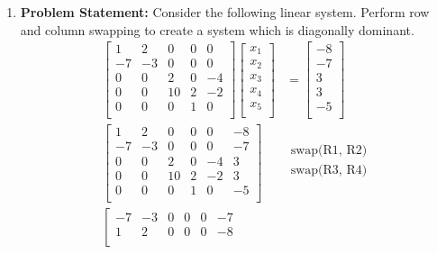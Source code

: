 \documentclass[12pt,twoside]{amsart}
\begin{document}
\begin{enumerate}
    \item \textbf{Problem Statement:} Consider the following linear system. Perform row and column swapping to create a system which is diagonally dominant.
    \begin{align*}
    \left[\begin{array}{ccccc}
        1 & 2 & 0 & 0 & 0 \\
        -7 & -3 & 0 & 0 & 0 \\
        0 & 0 & 2 & 0 & -4 \\
        0 & 0 & 10 & 2 & -2 \\
        0 & 0 & 0 & 1 & 0 \\
    \end{array}\right]\left[\begin{array}{c}
        x_1 \\
        x_2 \\
        x_3 \\
        x_4 \\
        x_5 \\
    \end{array}\right] & = \left[\begin{array}{c}
        -8 \\
        -7 \\
        3 \\
        3 \\
        -5 \\
    \end{array}\right] \\
    \left[\begin{array}{ccccc|c}
        1 & 2 & 0 & 0 & 0 & -8 \\
        -7 & -3 & 0 & 0 & 0 & -7 \\
        0 & 0 & 2 & 0 & -4 & 3 \\
        0 & 0 & 10 & 2 & -2 & 3 \\
        0 & 0 & 0 & 1 & 0 & -5 \\
    \end{array}\right] & \begin{array}{c}
        \text{swap(R1, R2)} \\
        \text{swap(R3, R4)} \\
    \end{array} \\
    \left[\begin{array}{ccccc|c}
        -7 & -3 & 0 & 0 & 0 & -7 \\
        1 & 2 & 0 & 0 & 0 & -8 \\

\end{array}
\end{align*}
\end{enumerate}
\end{document}
